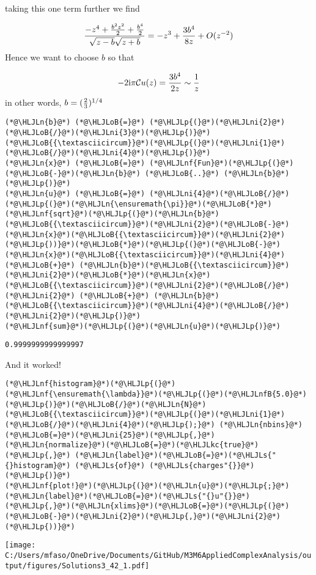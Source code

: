 \documentclass[12pt,landscape]{article}
\newcommand{\HLJLkc}[1]{\textcolor[RGB]{59,151,46}{\textit{#1}}}
\newcommand{\HLJLn}[1]{#1}
\newcommand{\HLJLnf}[1]{\textcolor[RGB]{66,102,213}{#1}}
\newcommand{\HLJLs}[1]{\textcolor[RGB]{201,61,57}{#1}}
\newcommand{\HLJLnfB}[1]{\textcolor[RGB]{59,151,46}{#1}}
\newcommand{\HLJLni}[1]{\textcolor[RGB]{59,151,46}{#1}}
\newcommand{\HLJLoB}[1]{\textcolor[RGB]{102,102,102}{\textbf{#1}}}
\newcommand{\HLJLp}[1]{#1}
\def\I{ {\rm i} }
\def\CC{ {\cal C} }
\begin{document}
{taking this one term further we find

\[
 {-z^4 +  {b^2z^2 \over 2} + {b^4 \over 2} \over \sqrt{z-b}\sqrt{z+b}} = -z^3 +{3 b^4 \over 8 z} + O(z^{-2})
\]
Hence we want to choose $b$ so that

\[
-2\I\pi \CC u(z) = {3 b^4 \over 2 z} \sim {1 \over z}
\]
in other words, $b = ({2 \over 3})^{1/4}$


\begin{lstlisting}
(*@\HLJLn{b}@*) (*@\HLJLoB{=}@*) (*@\HLJLp{(}@*)(*@\HLJLni{2}@*)(*@\HLJLoB{/}@*)(*@\HLJLni{3}@*)(*@\HLJLp{)}@*)(*@\HLJLoB{{\textasciicircum}}@*)(*@\HLJLp{(}@*)(*@\HLJLni{1}@*)(*@\HLJLoB{/}@*)(*@\HLJLni{4}@*)(*@\HLJLp{)}@*)
(*@\HLJLn{x}@*) (*@\HLJLoB{=}@*) (*@\HLJLnf{Fun}@*)(*@\HLJLp{(}@*)(*@\HLJLoB{-}@*)(*@\HLJLn{b}@*) (*@\HLJLoB{..}@*) (*@\HLJLn{b}@*)(*@\HLJLp{)}@*)
(*@\HLJLn{u}@*) (*@\HLJLoB{=}@*) (*@\HLJLni{4}@*)(*@\HLJLoB{/}@*)(*@\HLJLp{(}@*)(*@\HLJLn{\ensuremath{\pi}}@*)(*@\HLJLoB{*}@*)(*@\HLJLnf{sqrt}@*)(*@\HLJLp{(}@*)(*@\HLJLn{b}@*)(*@\HLJLoB{{\textasciicircum}}@*)(*@\HLJLni{2}@*)(*@\HLJLoB{-}@*)(*@\HLJLn{x}@*)(*@\HLJLoB{{\textasciicircum}}@*)(*@\HLJLni{2}@*)(*@\HLJLp{))}@*)(*@\HLJLoB{*}@*)(*@\HLJLp{(}@*)(*@\HLJLoB{-}@*)(*@\HLJLn{x}@*)(*@\HLJLoB{{\textasciicircum}}@*)(*@\HLJLni{4}@*) (*@\HLJLoB{+}@*) (*@\HLJLn{b}@*)(*@\HLJLoB{{\textasciicircum}}@*)(*@\HLJLni{2}@*)(*@\HLJLoB{*}@*)(*@\HLJLn{x}@*)(*@\HLJLoB{{\textasciicircum}}@*)(*@\HLJLni{2}@*)(*@\HLJLoB{/}@*)(*@\HLJLni{2}@*) (*@\HLJLoB{+}@*) (*@\HLJLn{b}@*)(*@\HLJLoB{{\textasciicircum}}@*)(*@\HLJLni{4}@*)(*@\HLJLoB{/}@*)(*@\HLJLni{2}@*)(*@\HLJLp{)}@*)
(*@\HLJLnf{sum}@*)(*@\HLJLp{(}@*)(*@\HLJLn{u}@*)(*@\HLJLp{)}@*)
\end{lstlisting}

\begin{lstlisting}
0.9999999999999997
\end{lstlisting}


And it worked!


\begin{lstlisting}
(*@\HLJLnf{histogram}@*)(*@\HLJLp{(}@*)(*@\HLJLnf{\ensuremath{\lambda}}@*)(*@\HLJLp{(}@*)(*@\HLJLnfB{5.0}@*)(*@\HLJLp{)}@*)(*@\HLJLoB{/}@*)(*@\HLJLn{N}@*)(*@\HLJLoB{{\textasciicircum}}@*)(*@\HLJLp{(}@*)(*@\HLJLni{1}@*)(*@\HLJLoB{/}@*)(*@\HLJLni{4}@*)(*@\HLJLp{);}@*) (*@\HLJLn{nbins}@*)(*@\HLJLoB{=}@*)(*@\HLJLni{25}@*)(*@\HLJLp{,}@*) (*@\HLJLn{normalize}@*)(*@\HLJLoB{=}@*)(*@\HLJLkc{true}@*)(*@\HLJLp{,}@*) (*@\HLJLn{label}@*)(*@\HLJLoB{=}@*)(*@\HLJLs{"{}histogram}@*) (*@\HLJLs{of}@*) (*@\HLJLs{charges"{}}@*)(*@\HLJLp{)}@*)
(*@\HLJLnf{plot!}@*)(*@\HLJLp{(}@*)(*@\HLJLn{u}@*)(*@\HLJLp{;}@*) (*@\HLJLn{label}@*)(*@\HLJLoB{=}@*)(*@\HLJLs{"{}u"{}}@*)(*@\HLJLp{,}@*)(*@\HLJLn{xlims}@*)(*@\HLJLoB{=}@*)(*@\HLJLp{(}@*)(*@\HLJLoB{-}@*)(*@\HLJLni{2}@*)(*@\HLJLp{,}@*)(*@\HLJLni{2}@*)(*@\HLJLp{))}@*)
\end{lstlisting}

\texttt{[image: C:/Users/mfaso/OneDrive/Documents/GitHub/M3M6AppliedComplexAnalysis/output/figures/Solutions3\_42\_1.pdf]}

}
\end{document}
